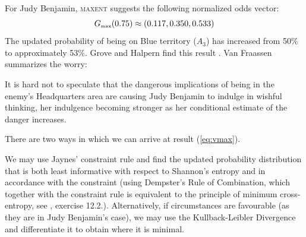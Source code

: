 \documentclass[12pt]{article}
\begin{document}
For Judy Benjamin, \textsc{maxent} suggests the following normalized
odds vector:
\begin{equation}
  \label{eq:vmax}
  G_{\mbox{{\tiny max}}}(0.75)\approx(0.117,0.350,0.533)
\end{equation}
The updated probability of being on Blue territory ($A_{3}$) has
increased from 50\% to approximately 53\%. Grove and Halpern find this
result  .
Van Fraassen summarizes the worry:
\begin{quotex}
  It is hard not to speculate that the dangerous implications of being
  in the enemy's Headquarters area are causing Judy Benjamin to
  indulge in wishful thinking, her indulgence becoming stronger as her
  conditional estimate of the danger increases. 
\end{quotex}

\bigskip

\nias There are two ways in which we can arrive at result
({\ref{eq:vmax}}).

We may use Jaynes' constraint rule and find the updated probability
distribution that is both least informative with respect to Shannon's
entropy and in accordance with the constraint (using Dempster's Rule
of Combination, which together with the constraint rule is equivalent
to the principle of minimum cross-entropy, see
, exercise 12.2.). Alternatively, if
circumstances are favourable (as they are in Judy Benjamin's case), we
may use the Kullback-Leibler Divergence and differentiate it to obtain
where it is minimal.



\end{document}
